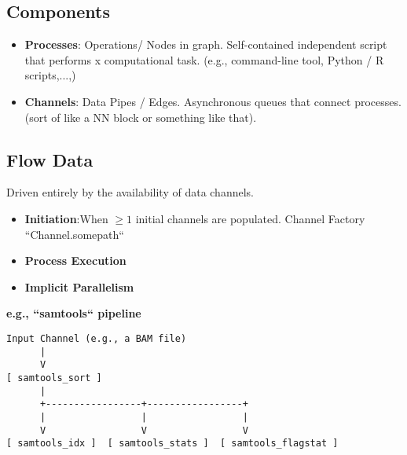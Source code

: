 \documentclass[../main.tex]{subfiles}
\begin{document}
\subsection{Components}
\begin{itemize}
    \item \textbf{Processes}: Operations/ Nodes in graph. Self-contained independent script that performs x computational task. (e.g., command-line tool, Python / R scripts,...,)
    \item\textbf{Channels}: Data Pipes / Edges. Asynchronous queues that connect processes. (sort of like a NN block or something like that).
\end{itemize}

\subsection{Flow Data}
Driven entirely by the availability of data channels.
\begin{itemize}
  
    \item \textbf{Initiation}:When $\geq 1$ initial channels are populated. Channel Factory ``Channel.somepath``
    \item \textbf{Process Execution}  
    \item \textbf{Implicit Parallelism}
\end{itemize}

\textbf{e.g., ``samtools`` pipeline}

\begin{verbatim}
Input Channel (e.g., a BAM file)
      |
      V
[ samtools_sort ]
      |
      +-----------------+-----------------+
      |                 |                 |
      V                 V                 V
[ samtools_idx ]  [ samtools_stats ]  [ samtools_flagstat ]

\end{verbatim}
\end{document}
